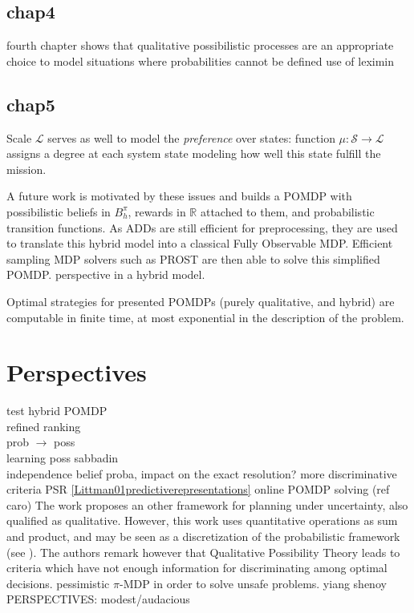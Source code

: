 \subsection*{chap4}
fourth chapter shows that 
qualitative possibilistic processes
are an appropriate choice
to model situations 
where probabilities 
cannot be defined
use of leximin

\subsection*{chap5}
Scale $\mathcal{L}$ serves as well to model 
the \emph{preference} over states: 
function $\mu: \mathcal{S} \rightarrow \mathcal{L}$ assigns a degree
at each system state modeling how well this state fulfill the mission. 


A future work is motivated by these issues
and builds a POMDP with possibilistic beliefs in $B_h^{\pi}$,
rewards in $\mathbb{R}$ attached to them,
and probabilistic transition functions.
As ADDs are still efficient for preprocessing,
they are used to translate this hybrid
model into a classical Fully Observable MDP.
Efficient sampling MDP solvers such as PROST 
are then able to solve this simplified POMDP. 
perspective in a hybrid model.


Optimal strategies for presented POMDPs (purely qualitative, and hybrid)
are computable in finite time, at most exponential in the description of the problem.


\section*{Perspectives}
test hybrid POMDP\\
refined ranking\\
prob $\rightarrow$ poss\\
learning poss sabbadin\\

independence belief proba, impact on the exact resolution?
\cite{LIP61723} more discriminative criteria
PSR \ref{Littman01predictiverepresentations}
online POMDP solving (ref caro)
The work \cite{Bonet:2002:QMP:2073876.2073884} proposes an other framework
for planning under uncertainty, also qualified as qualitative. 
However, this work uses quantitative operations
as sum and product, and may be seen as a discretization of the probabilistic framework
(see \cite{Wilson:1995:OMC:2074158.2074221}).
The authors remark however that Qualitative Possibility Theory leads to 
criteria which have not enough information for discriminating
among optimal decisions.
pessimistic $\pi$-MDP in order to solve unsafe problems. yiang shenoy
PERSPECTIVES: modest/audacious







